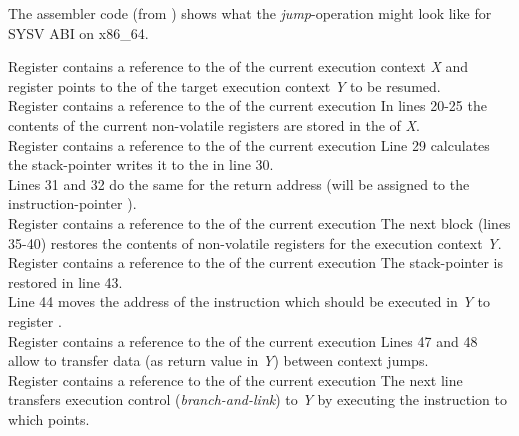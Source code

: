 \label{appendix}

The assembler code (from \boostcontext) shows what the \textit{jump}-operation
might look like for SYSV ABI on x86\_64.

Register  contains a reference to the \cblock of the current execution
context \textit{X} and register  points to the \cblock of the target execution
context \textit{Y} to be resumed.\\
\newline
Register  contains a reference to the \cblock of the current execution
In lines 20-25 the contents of the current non-volatile registers are stored in the
\cblock of \textit{X}.\\
\newline
Register  contains a reference to the \cblock of the current execution
Line 29 calculates the stack-pointer writes it to the \cblock in line 30.\\
Lines 31 and 32 do the same for the return address (will be assigned to the
instruction-pointer ).\\
\newline
Register  contains a reference to the \cblock of the current execution
The next block (lines 35-40) restores the contents of non-volatile registers for
the execution context \textit{Y}.\\
\newline
Register  contains a reference to the \cblock of the current execution
The stack-pointer is restored in line 43.\\
Line 44 moves the address of the instruction which should be executed in
\textit{Y} to register .\\
\newline
Register  contains a reference to the \cblock of the current execution
Lines 47 and 48 allow to transfer data (as return value in \textit{Y}) between
context jumps.\\
\newline
Register  contains a reference to the \cblock of the current execution
The next line transfers execution control (\textit{branch-and-link}) to
\textit{Y} by executing the instruction to which  points.
